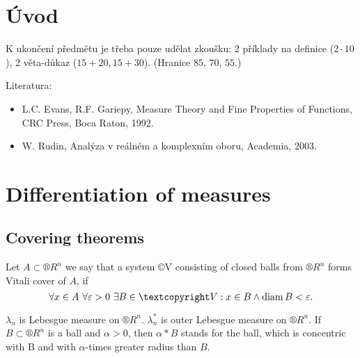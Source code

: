 \documentclass[12pt]{article}					%
\begin{document}
\section*{Úvod}
\begin{poznamka}
	K ukončení předmětu je třeba pouze udělat zkoušku: 2 příklady na definice ($2·10$), 2 věta-důkaz ($15+20, 15+30$). (Hranice $85$, $70$, $55$.)

	Literatura:
	\begin{itemize}
		\item L.C. Evans, R.F. Gariepy, Measure Theory and Fine Properties of Functions, CRC Press, Boca Raton, 1992.
		\item W. Rudin, Analýza v reálném a komplexním oboru, Academia, 2003.
	\end{itemize}
\end{poznamka}

\section{Differentiation of measures}
\subsection{Covering theorems}

\begin{definice}
	Let $A \subset ®R^n$ we say that a system ©V consisting of closed balls from $®R^n$ forms Vitali cover of $A$, if
	$$ \forall x \in A\ \forall \epsilon > 0\ \exists B \in ©V: x \in B \land \diam B < \epsilon. $$
\end{definice}

\begin{definice}[Notation]
	$\lambda_n$ is Lebesgue measure on $®R^n$. $\lambda_n^*$ is outer Lebesgue measure on $®R^n$. If $B \subset ®R^n$ is a ball and $\alpha > 0$, then $\alpha * B$ stands for the ball, which is concentric with B and with $\alpha$-times greater radius than $B$.
\end{definice}
\end{document}
